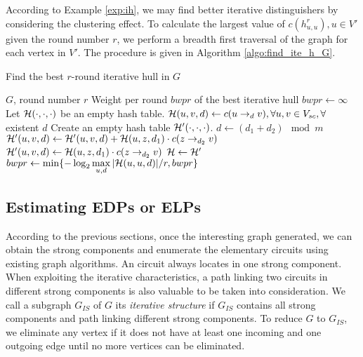 According to Example \ref{exp:ih}, we may find better iterative distinguishers by considering the clustering effect. To calculate the largest value of $c(h_{u,u}^r),u\in V'$ given the round number $r$, we perform a breadth first traversal of the graph for each vertex in $V'$. The procedure is given in Algorithm \ref{algo:find_ite_h_G}.


\begin{algorithm}
	\caption{Find the best $r$-round iterative hull in $G$}
	\label{algo:find_ite_h_G}
	\begin{algorithmic}[1]
        \Require $G$, round number $r$
        \Ensure Weight per round $bwpr$ of the best iterative hull
        \Procedure {}{}
        \State $bwpr\leftarrow\infty$
        \State Let $\mathcal{H}(\cdot,\cdot,\cdot)$ be an empty hash table. 
        \State $\mathcal{H}(u,v,d)\leftarrow c(u\rightarrow_d v),\forall u,v\in V_{sc},\forall$ existent $d$
        \State Create an empty hash table $\mathcal{H}'(\cdot,\cdot,\cdot)$.
        \State $d\leftarrow (d_1+d_2)\mod m$
        \State $\mathcal{H}'(u,v,d)\leftarrow\mathcal{H}'(u,v,d)+\mathcal{H}(u,z,d_1)\cdot c(z\rightarrow_{d_2} v)$
        \Else
        \State $\mathcal{H}'(u,v,d)\leftarrow\mathcal{H}(u,z,d_1)\cdot c(z\rightarrow_{d_2} v)$
        \EndIf
        \EndFor
        \State $\mathcal{H}\leftarrow \mathcal{H}'$
        \EndFor
        \State $bwpr\leftarrow \min\{-\log_2\max\limits_{u,d}|\mathcal{H}(u,u,d)|/r,bwpr\}$
        \EndFor
        \EndProcedure
	\end{algorithmic}
\end{algorithm}

\subsection{Estimating EDPs or ELPs}\label{sec:method-edp-elp}

According to the previous sections, once the interesting graph generated, we can obtain the strong components and enumerate the elementary circuits using existing graph algorithms. An circuit always locates in one strong component. When exploiting the iterative characteristics, a path linking two circuits in different strong components is also valuable to be taken into consideration. We call a subgraph $G_{IS}$ of $G$ its \textit{iterative structure} if $G_{IS}$ contains all strong components and path linking different strong components. To reduce $G$ to $G_{IS}$, we eliminate any vertex if it does not have at least one incoming and one outgoing edge until no more vertices can be eliminated. 

